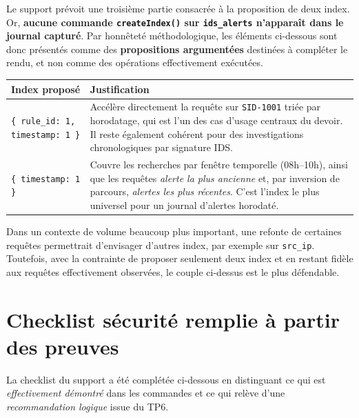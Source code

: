 \documentclass[11pt,a4paper]{article}
\begin{document}
Le support prévoit une troisième partie consacrée à la proposition de deux index. Or, \textbf{aucune commande \texttt{createIndex()} sur \texttt{ids\_alerts} n'apparaît dans le journal capturé}. Par honnêteté méthodologique, les éléments ci-dessous sont donc présentés comme des \textbf{propositions argumentées} destinées à compléter le rendu, et non comme des opérations effectivement exécutées.

\begin{tabularx}{\textwidth}{>{\ttfamily}p{5.5cm}X}
\toprule
Index proposé & Justification \\
\midrule
\texttt{\{ rule\_id: 1, timestamp: 1 \}} & Accélère directement la requête sur \texttt{SID-1001} triée par horodatage, qui est l'un des cas d'usage centraux du devoir. Il reste également cohérent pour des investigations chronologiques par signature IDS. \\
\texttt{\{ timestamp: 1 \}} & Couvre les recherches par fenêtre temporelle (08h--10h), ainsi que les requêtes \emph{alerte la plus ancienne} et, par inversion de parcours, \emph{alertes les plus récentes}. C'est l'index le plus universel pour un journal d'alertes horodaté. \\
\bottomrule
\end{tabularx}

Dans un contexte de volume beaucoup plus important, une refonte de certaines requêtes permettrait d'envisager d'autres index, par exemple sur \texttt{src\_ip}. Toutefois, avec la contrainte de proposer seulement deux index et en restant fidèle aux requêtes effectivement observées, le couple ci-dessus est le plus défendable.

\section{Checklist sécurité remplie à partir des preuves}

La checklist du support a été complétée ci-dessous en distinguant ce qui est \emph{effectivement démontré} dans les commandes et ce qui relève d'une \emph{recommandation logique} issue du TP6.
\end{document}
